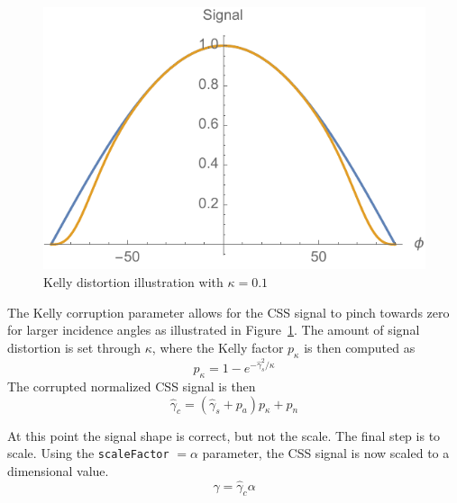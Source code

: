 \begin{figure}[htb]
	\centerline{
		\includegraphics[]{Figures/kelly}
	}
	\caption{Kelly distortion illustration with $\kappa = 0.1$}
	\label{fig:kelly}
\end{figure}
The Kelly corruption parameter allows for the CSS signal to pinch towards zero for larger incidence angles as illustrated in Figure~\ref{fig:kelly}.  The amount of signal distortion is set through $\kappa$, where the Kelly factor $p_{\kappa}$ is then computed as 
\begin{equation}
	p_{\kappa} = 1 - e^{-\hat\gamma_{s}^{2}/\kappa}
\end{equation}
The corrupted normalized CSS signal is then
\begin{equation}
	\hat \gamma_{c} = (\hat\gamma_{s} + p_{a}) p_{\kappa} + p_{n}
\end{equation}

At this point the signal shape is correct, but not the scale.  The final step is to scale.  Using the {\tt scaleFactor} $=\alpha$ parameter, the CSS signal is now scaled to a dimensional value.  
\begin{equation}
	\gamma = \hat{\gamma}_{c} \alpha
\end{equation}
